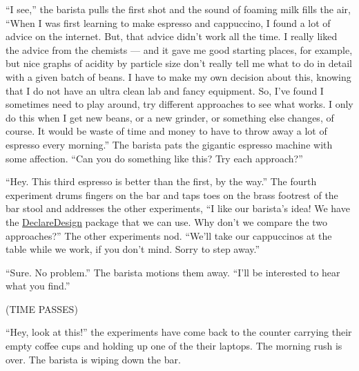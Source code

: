 \documentclass[
]{article}
\begin{document}
``I see,'' the barista pulls the first shot and the sound of foaming milk fills
the air, ``When I was first learning to make espresso and cappuccino, I found a
lot of advice on the internet. But, that advice didn't work all the time. I
really liked the advice from the chemists --- and it gave me good starting
places, for example, but nice graphs of acidity by particle size don't really
tell me what to do in detail with a given batch of beans. I
have to make my own decision about this, knowing that I do not have an ultra
clean lab and fancy equipment. So, I've found I sometimes need to play around,
try different approaches to see what works. I only do this when I get new
beans, or a new grinder, or something else changes, of course. It would be
waste of time and money to have to throw away a lot of espresso every morning.''
The barista pats the gigantic espresso machine with some affection. ``Can you do
something like this? Try each approach?''

``Hey. This third espresso is better than the first, by the way.'' The fourth
experiment drums fingers on the bar and taps toes on the brass footrest of the
bar stool and addresses the other experiments, ``I like our barista's idea! We have the
\href{https://declaredesign.org/}{DeclareDesign} package that we can use. Why don't
we compare the two approaches?'' The other experiments nod. ``We'll take our
cappuccinos at the table while we work, if you don't mind. Sorry to step away.''

``Sure. No problem.'' The barista motions them away. ``I'll be interested to hear what you find.''

(TIME PASSES)

``Hey, look at this!'' the experiments have come back to the counter carrying
their empty coffee cups and holding up one of the their laptops. The morning
rush is over. The barista is wiping down the bar.
\end{document}
